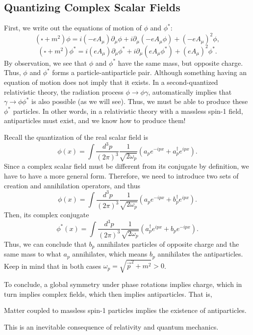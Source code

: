 \documentclass[11pt]{article}
\theoremstyle{definition}
\begin{document}
\subsection{Quantizing Complex Scalar Fields}
First, we write out the equations of motion of $\phi$ and $\phi^*$:
\begin{equation}
    (\square + m^2)\phi = i(-eA_\mu)\partial_\mu\phi + i\partial_\mu(-eA_\mu\phi)+(-eA_\mu)^2\phi,
\end{equation}
\begin{equation}
    (\square + m^2)\phi^* = i(eA_\mu)\partial_\mu\phi^* + i\partial_\mu(eA_\mu\phi^*)+(eA_\mu)^2\phi^*.
\end{equation}
By observation, we see that $\phi$ and $\phi^*$ have the same mass, but opposite charge. Thus, $\phi$ and $\phi^*$ forms a particle-antiparticle pair. Although something having an equation of motion does not imply that it exists. In a second-quantized relativistic theory, the radiation process $\phi \rightarrow \phi \gamma$, automatically implies that $\gamma \rightarrow \phi\phi^*$ is also possible (as we will see). Thus, we must be able to produce these $\phi^*$ particles. In other words,  in a relativistic theory with a massless spin-1 field, antiparticles must exist, and we know how to produce them!

Recall the quantization of the real scalar field is
\begin{equation}
    \phi(x) = \int \frac{d^3p}{(2\pi)^3}\frac{1}{\sqrt{2\omega_p}}(a_pe^{-ipx} + a_p^\dagger e^{ipx}).
\end{equation}
Since a complex scalar field must be different from its conjugate by definition, we have to have a more general form. Therefore, we need to introduce two sets of creation and annihilation operators, and thus
\begin{equation}
    \phi(x) =  \int \frac{d^3p}{(2\pi)^3}\frac{1}{\sqrt{2\omega_p}}(a_pe^{-ipx} + b_p^\dagger e^{ipx}).
\end{equation}
Then, its complex conjugate
\begin{equation}
    \phi^*(x) =  \int \frac{d^3p}{(2\pi)^3}\frac{1}{\sqrt{2\omega_p}}(a_p^\dagger e^{ipx} + b_p e^{-ipx}).
\end{equation}
Thus, we can conclude that $b_p$ annihilates particles of opposite charge and the same mass to what $a_p$ annihilates, which means $b_p$ annihilates the antiparticles. Keep in mind that in both cases $\omega_p = \sqrt{\vec{p}^2+m^2} > 0$. 

To conclude, a global symmetry under phase rotations implies charge, which in turn implies complex fields, which then implies antiparticles. That is,
\begin{shaded}
    Matter coupled to massless spin-1 particles implies the existence of antiparticles.
\end{shaded}
This is an inevitable consequence of relativity and quantum mechanics.
\end{document}
